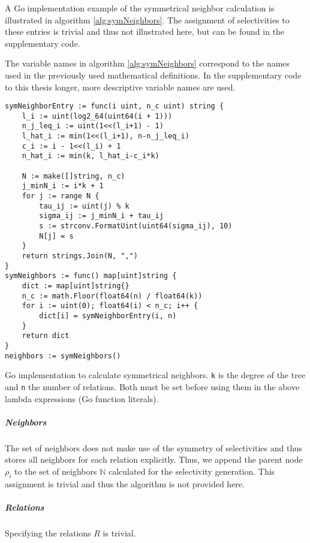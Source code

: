 A Go implementation example of the symmetrical neighbor calculation is illustrated in algorithm \ref{alg:symNeighbors}. The assignment of selectivities to these entries is trivial and thus not illustrated here, but can be found in the supplementary code.

\begin{note}
The variable names in algorithm \ref{alg:symNeighbors} correspond to the names used in the previously used mathematical definitions. In the supplementary code to this thesis longer, more descriptive variable names are used.
\end{note}


\begin{algorithm}[H]
\begin{verbatim}
symNeighborEntry := func(i uint, n_c uint) string {
    l_i := uint(log2_64(uint64(i + 1)))
    n_j_leq_i := uint(1<<(l_i+1) - 1)
    l_hat_i := min(1<<(l_i+1), n-n_j_leq_i)
    c_i := i - 1<<(l_i) + 1
    n_hat_i := min(k, l_hat_i-c_i*k)

    N := make([]string, n_c)
    j_minN_i := i*k + 1
    for j := range N {
        tau_ij := uint(j) % k
        sigma_ij := j_minN_i + tau_ij
        s := strconv.FormatUint(uint64(sigma_ij), 10)
        N[j] = s
    }
    return strings.Join(N, ",")
}
symNeighbors := func() map[uint]string {
    dict := map[uint]string{}
    n_c := math.Floor(float64(n) / float64(k))
    for i := uint(0); float64(i) < n_c; i++ {
        dict[i] = symNeighborEntry(i, n)
    }
    return dict
}
neighbors := symNeighbors()
\end{verbatim}
\caption{Go implementation to calculate symmetrical neighbors. \texttt{k} is the degree of the tree and \texttt{n} the number of relations. Both must be set before using them in the above lambda expressions (Go function literals).}
\label{alg:symNeighbors}
\end{algorithm}

\subparagraph{Neighbors}
The set of neighbors does not make use of the symmetry of selectivities and thus stores all neighbors for each relation explicitly. Thus, we append the parent node $\rho_i$ to the set of neighbors $\mathbb{N}$ calculated for the selectivity generation. This assignment is trivial and thus the algorithm is not provided here.

\subparagraph{Relations}
Specifying the relations $R$ is trivial. 

